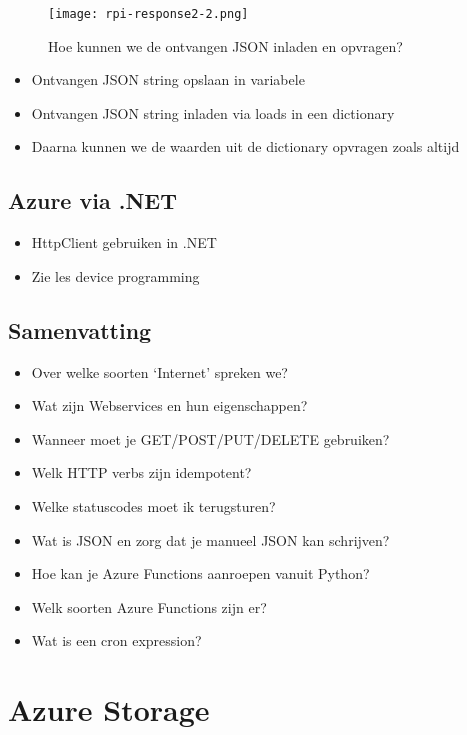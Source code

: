\documentclass{article}
\begin{document}
\begin{figure}[H]
    \centering
    \texttt{[image: rpi-response2-2.png]}
    \caption{Hoe kunnen we de ontvangen JSON inladen en opvragen?}
\end{figure}

\begin{itemize}
    \item Ontvangen JSON string opslaan in variabele
    \item Ontvangen JSON string inladen via loads in een dictionary
    \item Daarna kunnen we de waarden uit de dictionary opvragen zoals altijd
\end{itemize}

\subsection{Azure via .NET}
\begin{itemize}
    \item HttpClient gebruiken in .NET
    \item Zie les device programming
\end{itemize}


\subsection{Samenvatting}
\begin{itemize}
    \item Over welke soorten `Internet'  spreken we?
    \item Wat zijn Webservices en hun eigenschappen?
    \item Wanneer moet je GET/POST/PUT/DELETE gebruiken?
    \item Welk HTTP verbs zijn idempotent?
    \item Welke statuscodes moet ik terugsturen?
    \item Wat is JSON en zorg dat je manueel JSON kan schrijven?
    \item Hoe kan je Azure Functions aanroepen vanuit Python?
    \item Welk soorten Azure Functions zijn er?
    \item Wat is een cron expression?
\end{itemize}

\section{Azure Storage}
\end{document}
